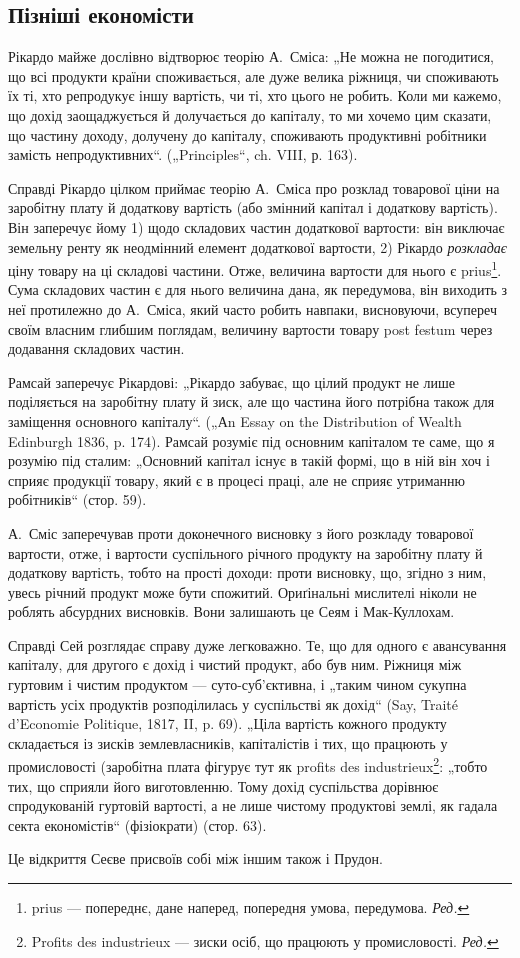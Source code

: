 \subsection[Пізніші економісти]{Пізніші економісти\footnotemark{}}


\label{original-299}
Рікардо
майже дослівно відтворює теорію А.~Сміса: „Не можна не
погодитися, що всі продукти країни споживається, але дуже велика ріжниця,
чи споживають їх ті, хто репродукує іншу вартість, чи ті, хто
цього не робить. Коли ми кажемо, що дохід заощаджується й долучається
до капіталу, то ми хочемо цим сказати, що частину доходу, долучену
до капіталу, споживають продуктивні робітники замість непродуктивних“.
(„Principles“, ch. VIII, р. 163).

Справді Рікардо цілком приймає теорію А.~Сміса про розклад товарової
ціни на заробітну плату й додаткову вартість (або змінний капітал
і додаткову вартість). Він заперечує йому 1) щодо складових частин
додаткової вартости: він виключає земельну ренту як неодмінний елемент
додаткової вартости, 2) Рікардо \emph{розкладає} ціну товару на ці складові
частини. Отже, величина вартости для нього є prius\footnote*{
prius — попереднє, дане наперед, попередня умова, передумова. \emph{Ред.}
}. Сума складових
частин є для нього величина дана, як передумова, він виходить з
неї протилежно до А.~Сміса, який часто робить навпаки, висновуючи,
всупереч своїм власним глибшим поглядам, величину вартости товару
post festum через додавання складових частин.

Рамсай заперечує Рікардові: „Рікардо забуває, що цілий продукт не
лише поділяється на заробітну плату й зиск, але що частина його потрібна
також для заміщення основного капіталу“. („Аn Essay on the Distribution
of Wealth Edinburgh 1836, p. 174). Рамсай розуміє під основним
капіталом те саме, що я розумію під сталим: „Основний капітал
існує в такій формі, що в ній він хоч і сприяє продукції товару, який є
в процесі праці, але не сприяє утриманню робітників“ (стор. 59).

А.~Сміс заперечував проти доконечного висновку з його розкладу
товарової вартости, отже, і вартости суспільного річного продукту на
заробітну плату й додаткову вартість, тобто на прості доходи: проти
висновку, що, згідно з ним, увесь річний продукт може бути спожитий.
Ориґінальні мислителі ніколи не роблять абсурдних висновків. Вони залишають
це Сеям і Мак-Куллохам.

Справді Сей розглядає справу дуже легковажно. Те, що для одного є
авансування капіталу, для другого є дохід і чистий продукт, або був ним.
Ріжниця між гуртовим і чистим продуктом — суто-суб’єктивна, і „таким чином
сукупна вартість усіх продуктів розподілилась у суспільстві як дохід“ (Say,
Traité d’Economie Politique, 1817, II, p. 69). „Ціла вартість кожного продукту
складається із зисків землевласників, капіталістів і тих, що працюють у
промисловості (заробітна плата фігурує тут як profits des industrieux\footnote*{
Profits des industrieux — зиски осіб, що працюють у промисловості. \emph{Ред.}
}:
„тобто тих, що сприяли його виготовленню. Тому дохід суспільства дорівнює
спродукованій   гуртовій   вартості, а не лише чистому
продуктові землі, як гадала секта економістів“ (фізіократи) (стор. 63).

Це відкриття Сеєве присвоїв собі між іншим також і Прудон.
